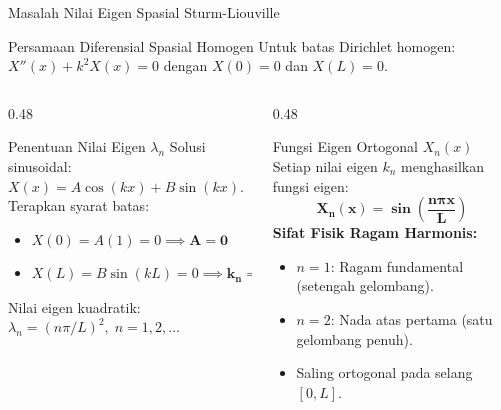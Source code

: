 \documentclass[aspectratio=169,10pt]{beamer}
\begin{document}
\begin{frame}{Masalah Nilai Eigen Spasial Sturm-Liouville}
  \begin{block}{Persamaan Diferensial Spasial Homogen}
    Untuk batas Dirichlet homogen: $X''(x) + k^2 X(x) = 0$ dengan $X(0) = 0$ dan $X(L) = 0$.
  \end{block}
  \begin{columns}[t]
    \begin{column}{0.48\textwidth}
      \begin{alertblock}{Penentuan Nilai Eigen $\lambda_n$}
        \small
        Solusi sinusoidal: $X(x) = A \cos(kx) + B \sin(kx)$.\\[2pt]
        Terapkan syarat batas:
        \begin{itemize}
          \item $X(0) = A(1) = 0 \implies \mathbf{A = 0}$
          \item $X(L) = B \sin(kL) = 0 \implies \mathbf{k_n = \frac{n\pi}{L}}$
        \end{itemize}
        Nilai eigen kuadratik: $\lambda_n = (n\pi/L)^2, \; n = 1, 2, \dots$
      \end{alertblock}
    \end{column}
    \begin{column}{0.48\textwidth}
      \begin{exampleblock}{Fungsi Eigen Ortogonal $X_n(x)$}
        \small
        Setiap nilai eigen $k_n$ menghasilkan fungsi eigen:
        \begin{equation*}
          \mathbf{X_n(x) = \sin\left(\frac{n\pi x}{L}\right)}
        \end{equation*}
        \textbf{Sifat Fisik Ragam Harmonis:}
        \begin{itemize}
          \item $n = 1$: Ragam fundamental (setengah gelombang).
          \item $n = 2$: Nada atas pertama (satu gelombang penuh).
          \item Saling ortogonal pada selang $[0, L]$.
        \end{itemize}
      \end{exampleblock}
    \end{column}
  \end{columns}
\end{frame}
\end{document}
